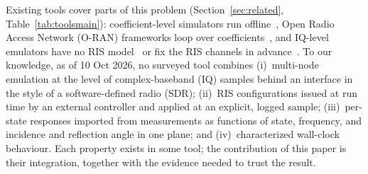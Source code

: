 Existing tools cover parts of this problem (Section~\ref{sec:related},
Table~\ref{tab:toolsmain}): coefficient-level simulators run
offline~\cite{Basar2020SimRIS,Burtakov2023QRIS}, Open Radio Access Network (O-RAN) frameworks
loop over coefficients~\cite{ElGhalbzouri2025GoSimRIS,Kayraklik2026ORIX}, and IQ-level
emulators have no RIS model~\cite{Gurses2026ACHEM,OAIrfsim,srsRANZMQ} or fix the RIS channels
in advance~\cite{Tsampazi2025RISColosseum,Tsampazi2025ORISing}.
To our knowledge, as of 10 Oct 2026, no surveyed tool combines
(i)~multi-node emulation at the level of complex-baseband (IQ) samples behind an interface in the style
of a software-defined radio (SDR); (ii)~RIS configurations issued at run time by an external controller and
applied at an explicit, logged sample; (iii)~per-state responses imported from
measurements as functions of state, frequency, and incidence and reflection angle in one plane; and
(iv)~characterized wall-clock behaviour. Each property exists in some tool; the
contribution of this paper is their integration, together with the evidence needed to
trust the result.

